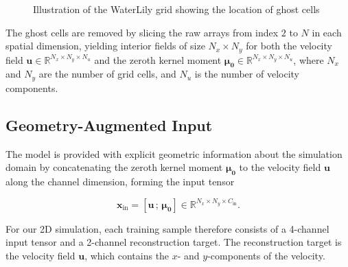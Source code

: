 \begin{figure}[H]
    \caption{Illustration of the WaterLily grid showing the location of ghost cells }
    \label{fig: ghost cells}
\end{figure}

The ghost cells are removed by slicing the raw arrays from index $2$ to $N$ in each spatial dimension, yielding interior fields of size $N_x \times N_y$ for both the velocity field $\mathbf{u}\in \mathbb{R}^{N_x\times N_y \times N_u}$ and the zeroth kernel moment  $\boldsymbol{\mu_0} \in \mathbb{R}^{N_x \times N_y \times N_u}$, where $N_x$ and $N_y$ are the number of grid cells, and $N_u$ is the number of velocity components.

\subsection{Geometry-Augmented Input}
\label{subsect: channels}

The model is provided with explicit geometric information about the simulation domain by concatenating the zeroth kernel moment $\boldsymbol{\mu_0}$ to the velocity field $\mathbf{u}$ along the channel dimension, forming the input tensor

\begin{equation}\label{eq:input_tensor}
    \mathbf{x}_\text{in} = [\mathbf{u}\, ;\, \boldsymbol{\mu_0}] \in 
    \mathbb{R}^{N_x \times N_y \times C_\text{in}}.
\end{equation}

For our 2D simulation, each training sample therefore consists of a 4-channel input tensor and a 2-channel reconstruction target. The reconstruction target is the velocity field $\mathbf{u}$, which contains the $x$- and $y$-components of the velocity. 

